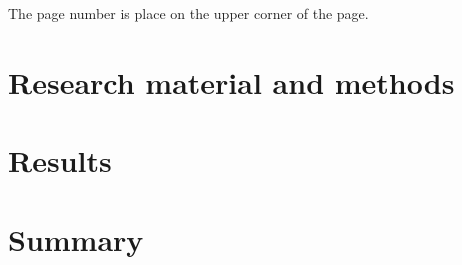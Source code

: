 The page number is place on the upper corner of the page.




\clearpage

\section{Research material and methods}


\clearpage

\section{Results}



\clearpage

\section{Summary} 


